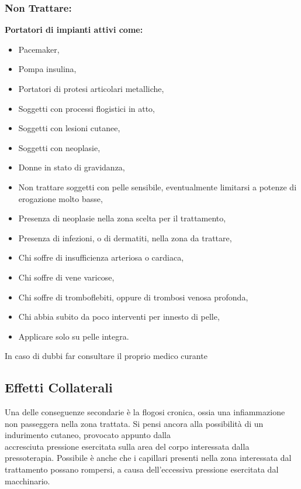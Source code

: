 \documentclass[a4paper]{article}
\begin{document}
\subsubsection{Non Trattare:}

\vspace{10pt}
\textbf{Portatori di impianti attivi come:}
\begin{itemize}
  \item Pacemaker,
  \item Pompa insulina,
  \item Portatori di protesi articolari metalliche,
  \item Soggetti con processi flogistici in atto,
  \item Soggetti con lesioni cutanee,
  \item Soggetti con neoplasie,
  \item Donne in stato di gravidanza,
  \item Non trattare soggetti con pelle sensibile, eventualmente limitarsi a potenze di erogazione molto basse,
  \item Presenza di neoplasie nella zona scelta per il trattamento,
  \item Presenza di infezioni, o di dermatiti, nella zona da trattare,
  \item Chi soffre di insufficienza arteriosa o cardiaca,
  \item Chi soffre di vene varicose,
  \item Chi soffre di tromboflebiti, oppure di trombosi venosa profonda,
  \item Chi abbia subito da poco interventi per innesto di pelle,
  \item Applicare solo su pelle integra.
\end{itemize}

In caso di dubbi far consultare il proprio medico curante

\subsection{Effetti Collaterali}
Una delle conseguenze secondarie è la flogosi cronica, ossia una infiammazione non passeggera nella zona trattata. Si pensi ancora alla possibilità di un indurimento cutaneo, provocato appunto dalla\\
accresciuta pressione esercitata sulla area del corpo interessata dalla pressoterapia. Possibile è anche che i capillari presenti nella zona interessata dal trattamento possano rompersi, a causa dell'eccessiva pressione esercitata dal macchinario.
\end{document}
